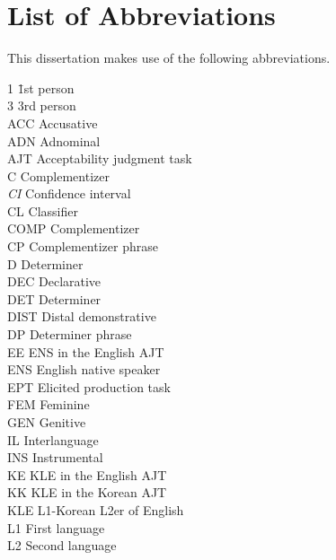 \documentclass[12pt]{report}
\begin{document}

\chapter*{List of Abbreviations}
\renewcommand\thepage{\romannumeral\numexpr\value{page}\relax}

\noindent This dissertation makes use of the following abbreviations.

\begin{multicols}{2}
\begin{tabbing}
1 \hspace{1.5cm} \= 1st person \\
3 \> 3rd person \\
ACC \> Accusative \\
ADN \> Adnominal \\
AJT \> Acceptability judgment task \\
C \> Complementizer \\
\textit{CI} \> Confidence interval \\
CL \> Classifier \\
COMP \> Complementizer \\
CP \> Complementizer phrase \\
D \> Determiner \\
DEC \> Declarative \\
DET \> Determiner \\
DIST \> Distal demonstrative \\
DP \> Determiner phrase \\
EE \> ENS in the English AJT \\
ENS \> English native speaker \\
EPT \> Elicited production task \\
FEM \> Feminine \\
GEN \> Genitive \\
IL \> Interlanguage \\
INS \> Instrumental \\
KE \> KLE in the English AJT \\
KK \> KLE in the Korean AJT \\
KLE \> L1-Korean L2er of English \\
L1 \> First language \\
L2 \> Second language \\

\end{tabbing}
\end{multicols}
\end{document}
